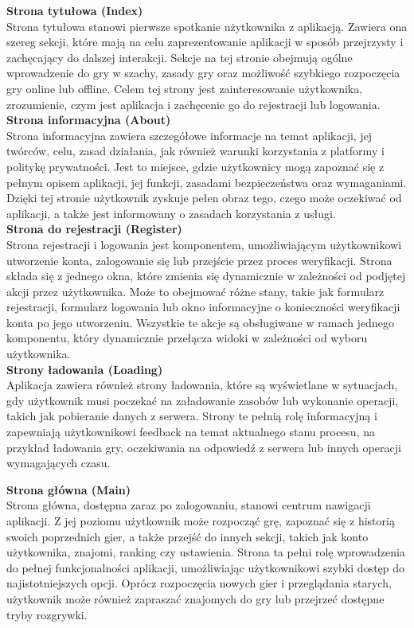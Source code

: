 \documentclass[twoside]{projektInzynierskiMS1}
\begin{document}
\noindent \textbf{Strona tytułowa (Index)}\\
Strona tytułowa stanowi pierwsze spotkanie użytkownika z aplikacją. Zawiera ona szereg sekcji, które mają na celu zaprezentowanie aplikacji w sposób przejrzysty i zachęcający do dalszej interakcji. Sekcje na tej stronie obejmują ogólne wprowadzenie do gry w szachy, zasady gry oraz możliwość szybkiego rozpoczęcia gry online lub offline. Celem tej strony jest zainteresowanie użytkownika, zrozumienie, czym jest aplikacja i zachęcenie go do rejestracji lub logowania.
\\

\noindent \textbf{Strona informacyjna (About)}\\
Strona informacyjna zawiera szczegółowe informacje na temat aplikacji, jej twórców, celu, zasad działania, jak również warunki korzystania z platformy i politykę prywatności. Jest to miejsce, gdzie użytkownicy mogą zapoznać się z pełnym opisem aplikacji, jej funkcji, zasadami bezpieczeństwa oraz wymaganiami. Dzięki tej stronie użytkownik zyskuje pełen obraz tego, czego może oczekiwać od aplikacji, a także jest informowany o zasadach korzystania z usługi.
\\

\noindent \textbf{Strona do rejestracji (Register)}\\
Strona rejestracji i logowania jest komponentem, umożliwiającym użytkownikowi utworzenie konta, zalogowanie się lub przejście przez proces weryfikacji. Strona składa się z jednego okna, które zmienia się dynamicznie w zależności od podjętej akcji przez użytkownika. Może to obejmować różne stany, takie jak formularz rejestracji, formularz logowania lub okno informacyjne o konieczności weryfikacji konta po jego utworzeniu. Wszystkie te akcje są obsługiwane w ramach jednego komponentu, który dynamicznie przełącza widoki w zależności od wyboru użytkownika.
\\

\noindent \textbf{Strony ładowania (Loading)}\\
Aplikacja zawiera również strony ładowania, które są wyświetlane w sytuacjach, gdy użytkownik musi poczekać na załadowanie zasobów lub wykonanie operacji, takich jak pobieranie danych z serwera. Strony te pełnią rolę informacyjną i zapewniają użytkownikowi feedback na temat aktualnego stanu procesu, na przykład ładowania gry, oczekiwania na odpowiedź z serwera lub innych operacji wymagających czasu.

\newpage

\noindent \textbf{Strona główna (Main)}\\
Strona główna, dostępna zaraz po zalogowaniu, stanowi centrum nawigacji aplikacji. Z jej poziomu użytkownik może rozpocząć grę, zapoznać się z historią swoich poprzednich gier, a także przejść do innych sekcji, takich jak konto użytkownika, znajomi, ranking czy ustawienia. Strona ta pełni rolę wprowadzenia do pełnej funkcjonalności aplikacji, umożliwiając użytkownikowi szybki dostęp do najistotniejszych opcji. Oprócz rozpoczęcia nowych gier i przeglądania starych, użytkownik może również zapraszać znajomych do gry lub przejrzeć dostępne tryby rozgrywki.
\\
\end{document}
